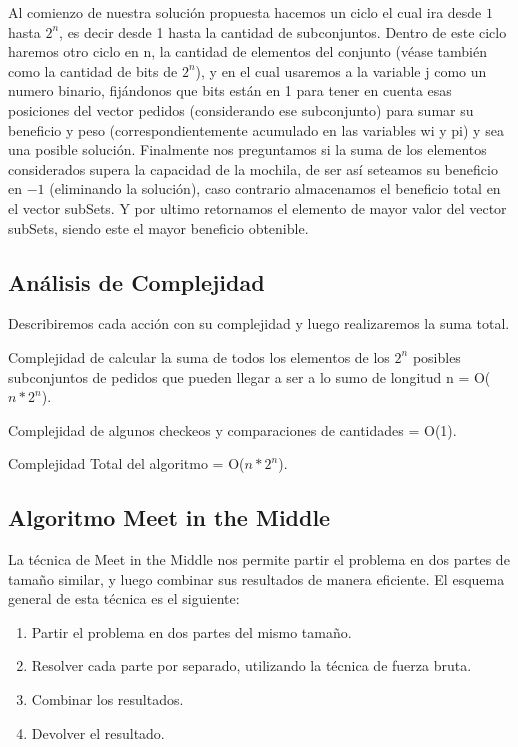 Al comienzo de nuestra solución propuesta hacemos un ciclo el cual ira desde $1$ hasta $2^{n}$, es decir desde 1 hasta la cantidad de subconjuntos. Dentro de este ciclo haremos otro ciclo en n, la cantidad de elementos del conjunto (véase también como la cantidad de bits de $2^{n}$), y en el cual usaremos a la variable j como un numero binario, fijándonos que bits están en 1 para tener en cuenta esas posiciones del vector pedidos (considerando ese subconjunto) para sumar su beneficio y peso (correspondientemente acumulado en las variables wi y pi) y sea una posible solución. Finalmente nos preguntamos si la suma de los elementos considerados supera la capacidad de la mochila, de ser así seteamos su beneficio en $-1$ (eliminando la solución), caso contrario almacenamos el beneficio total en el vector subSets. Y por ultimo retornamos el elemento de mayor valor del vector subSets, siendo este el mayor beneficio obtenible.

\subsection*{Análisis de Complejidad}
Describiremos cada acción con su complejidad y luego realizaremos la suma total.


Complejidad de calcular la suma de todos los elementos de los $2^{n}$ posibles subconjuntos de pedidos que pueden llegar a ser a lo sumo de longitud n = O($n*2^{n}$).


Complejidad de algunos checkeos y comparaciones de cantidades = O(1).

 
Complejidad Total del algoritmo = O($n*2^{n}$).


\subsection{Algoritmo Meet in the Middle}

La técnica de Meet in the Middle nos permite partir el problema en dos partes de tamaño similar, y luego combinar sus resultados de manera eficiente.
El esquema general de esta técnica es el siguiente:

\begin{enumerate}
\item Partir el problema en dos partes del mismo tamaño.
\item Resolver cada parte por separado, utilizando la técnica de fuerza bruta.
\item Combinar los resultados.
\item Devolver el resultado.
\end{enumerate}

